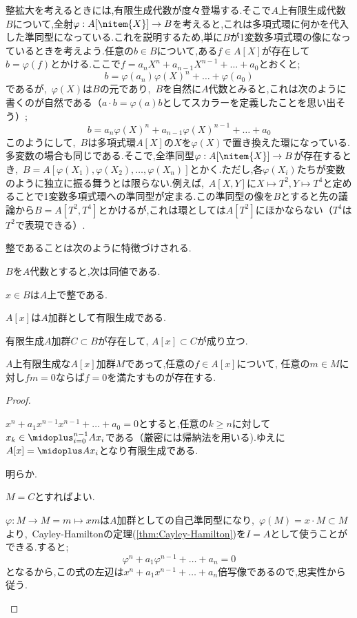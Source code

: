 整拡大を考えるときには,有限生成代数が度々登場する.そこで$A$上有限生成代数$B$について,全射$\varphi:A[\nitem{X}]\to B$を考えると,これは多項式環に何かを代入した準同型になっている.これを説明するため,単に$B$が1変数多項式環の像になっているときを考えよう.任意の$b\in B$について,ある$f\in A[X]$が存在して$b=\varphi(f)$とかける.ここで$f=a_nX^n+a_{n-1}X^{n-1}+\dots+a_0$とおくと;
\[b=\varphi(a_n)\varphi(X)^n+\dots+\varphi(a_0)\]
であるが,~$\varphi(X)$は$B$の元であり,~$B$を自然に$A$代数とみると,これは次のように書くのが自然である（$a\cdot b=\varphi(a)b$としてスカラーを定義したことを思い出そう）;
\[b=a_n\varphi(X)^n+a_{n-1}\varphi(X)^{n-1}+\dots+a_0\]
このようにして,~$B$は多項式環$A[X]$の$X$を$\varphi(X)$で置き換えた環になっている.多変数の場合も同じである.そこで,全準同型$\varphi:A[\nitem{X}]\to B$が存在するとき,~$B=A[\varphi(X_1),\varphi(X_2),\dots,\varphi(X_n)]$とかく.ただし,各$\varphi(X_i)$たちが変数のように独立に振る舞うとは限らない.例えば,~$A[X,Y]$に$X\mapsto T^2,Y\mapsto T^4$と定めることで1変数多項式環への準同型が定まる.この準同型の像を$B$とすると先の議論から$B=A[T^2,T^4]$とかけるが,これは環としては$A[T^2]$にほかならない（$T^4$は$T^2$で表現できる）.

整であることは次のように特徴づけされる.
\begin{prop}\label{prop:整拡大の特徴づけ}
	$B$を$A$代数とすると,次は同値である.
	\begin{sakura}
		\item	$x\in B$は$A$上で整である.
		\item	$A[x]$は$A$加群として有限生成である.
		\item	有限生成$A$加群$C\subset B$が存在して, $A[x]\subset C$が成り立つ.
		\item	$A$上有限生成な$A[x]$加群$M$であって,任意の$f\in A[x]$について, 任意の$m\in M$に対し$fm=0$ならば$f=0$を満たすものが存在する.
	\end{sakura}
\end{prop}
\begin{proof}
	\begin{eqv}[4]
		\item $x^n+a_1x^{n-1}x^{n-1}+\dots+a_0=0$とすると,任意の$k\geq n$に対して$x_k\in \midoplus_{i=0}^{n-1}Ax_i$である（厳密には帰納法を用いる).ゆえに$A[x]=\midoplus Ax_i$となり有限生成である.
		
		\item 明らか. 
		\item $M=C$とすればよい.
		\item $\varphi:M\to M=m\mapsto xm$は$A$加群としての自己準同型になり,~$\varphi(M)=x\cdot M\subset M$より,~Cayley-Hamiltonの定理(\ref{thm:Cayley-Hamilton})を$I=A$として使うことができる.すると;
		\[\varphi^n+a_1\varphi^{n-1}+\dots+a_n=0\]
		となるから,この式の左辺は$x^n+a_1x^{n-1}+\dots+a_n$倍写像であるので,忠実性から従う.
	\end{eqv}
\end{proof}

